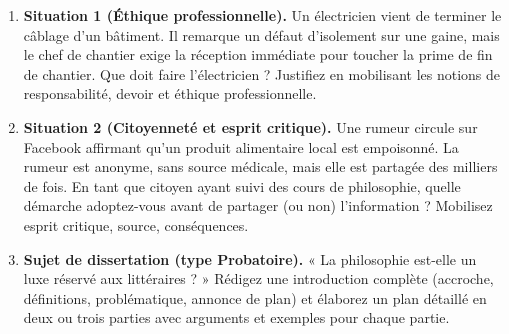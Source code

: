 \documentclass[11pt]{article}
\newcommand{\cle}[1]{{\popxbold\color{popdark}#1}}
\begin{document}
\begin{exercice}
\begin{enumerate}
\item \textbf{Situation 1 (Éthique professionnelle).} Un électricien vient de terminer le câblage d'un bâtiment. Il remarque un défaut d'isolement sur une gaine, mais le chef de chantier exige la réception immédiate pour toucher la prime de fin de chantier. Que doit faire l'électricien ? Justifiez en mobilisant les notions de \cle{responsabilité}, \cle{devoir} et \cle{éthique professionnelle}.
\item \textbf{Situation 2 (Citoyenneté et esprit critique).} Une rumeur circule sur Facebook affirmant qu'un produit alimentaire local est empoisonné. La rumeur est anonyme, sans source médicale, mais elle est partagée des milliers de fois. En tant que citoyen ayant suivi des cours de philosophie, quelle démarche adoptez-vous avant de partager (ou non) l'information ? Mobilisez \cle{esprit critique}, \cle{source}, \cle{conséquences}.
\item \textbf{Sujet de dissertation (type Probatoire).} « La philosophie est-elle un luxe réservé aux littéraires ? » Rédigez une introduction complète (accroche, définitions, problématique, annonce de plan) et élaborez un plan détaillé en deux ou trois parties avec arguments et exemples pour chaque partie.
\end{enumerate}
\end{exercice}
\end{document}
